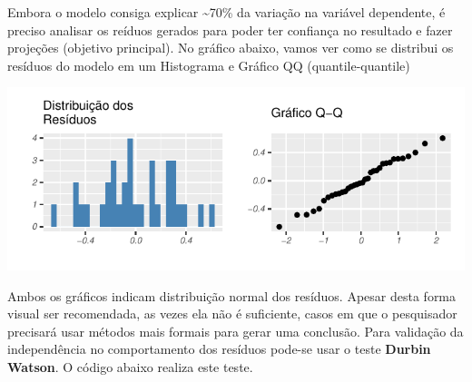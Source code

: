 \documentclass[
  12pt,
  a4paper,
]{article}
\begin{document}
Embora o modelo consiga explicar \textasciitilde70\% da variação na variável dependente, é preciso analisar os reíduos gerados para poder ter confiança no resultado e fazer projeções (objetivo principal). No gráfico abaixo, vamos ver como se distribui os resíduos do modelo em um Histograma e Gráfico QQ (quantile-quantile)

\begin{center}\includegraphics{article_files/figure-latex/unnamed-chunk-10-1} \end{center}

Ambos os gráficos indicam distribuição normal dos resíduos. Apesar desta forma visual ser recomendada, as vezes ela não é suficiente, casos em que o pesquisador precisará usar métodos mais formais para gerar uma conclusão. Para validação da independência no comportamento dos resíduos pode-se usar o teste \textbf{Durbin Watson}. O código abaixo realiza este teste.
\end{document}
